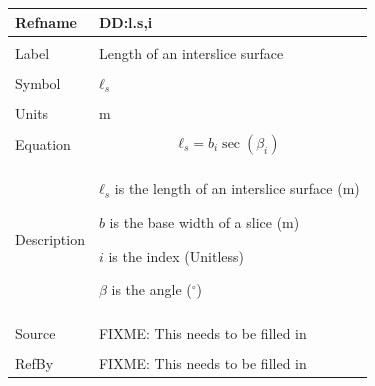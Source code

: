 \documentclass[12pt]{article}
\begin{document}
\noindent \begin{minipage}{\textwidth}
\begin{tabular}{p{} p{}}
\toprule \textbf{Refname} & \textbf{DD:l.s,i}
\label{DD:l.s,i}
\\ \midrule \\
Label & Length of an interslice surface
\\ \midrule \\
Symbol & ${ℓ_{s}}$
\\ \midrule \\
Units & m
\\ \midrule \\
Equation & \begin{dmath}
           {ℓ_{s}}=b_{i} \sec\left(β_{i}\right)
           \end{dmath}
\\ \midrule \\
Description & \begin{symbDescription}
              \item{${ℓ_{s}}$ is the length of an interslice surface (m)}
              \item{$b$ is the base width of a slice (m)}
              \item{$i$ is the index (Unitless)}
              \item{$β$ is the angle (${}^{\circ}$)}
              \end{symbDescription}
\\ \midrule \\
Source & FIXME: This needs to be filled in
\\ \midrule \\
RefBy & FIXME: This needs to be filled in
\\ \bottomrule \end{tabular}
\end{minipage}\\
~\newline
\end{document}

